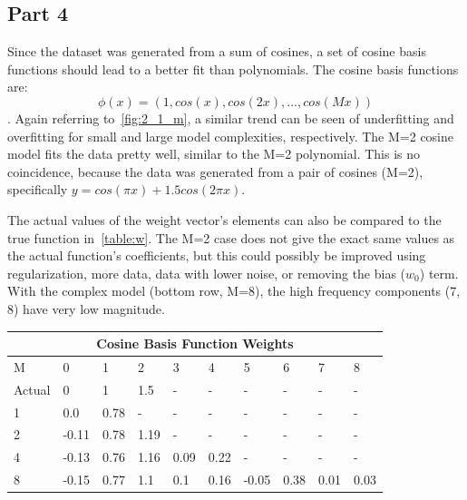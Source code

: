 \subsection{Part 4}
Since the dataset was generated from a sum of cosines, a set of cosine basis functions should lead to a better fit than polynomials.
The cosine basis functions are:
\begin{equation}
	\phi(x)=(1, cos(x), cos(2x), ... , cos(Mx))
\end{equation}.
Again referring to~\cref{fig:2_1_m}, a similar trend can be seen of underfitting and overfitting for small and large model complexities, respectively.
The M=2 cosine model fits the data pretty well, similar to the M=2 polynomial.
This is no coincidence, because the data was generated from a pair of cosines (M=2), specifically $y = cos(\pi x) + 1.5cos(2\pi x)$.

The actual values of the weight vector's elements can also be compared to the true function in~\cref{table:w}.
The M=2 case does not give the exact same values as the actual function's coefficients, but this could possibly be improved using regularization, more data, data with lower noise, or removing the bias ($w_0$) term.
With the complex model (bottom row, M=8), the high frequency components (7, 8) have very low magnitude.

\begin{table}[t]
  \centering
	\begin{tabular}{|p{1cm}||p{1cm}|p{1cm}|p{1cm}|p{1cm}|p{1cm}|p{1cm}|p{1cm}|p{1cm}|p{1cm}|}
	 \hline
	 \multicolumn{10}{|c|}{Cosine Basis Function Weights} \\
	 \hline
	 M & 0 & 1 & 2 & 3 & 4 & 5 & 6 & 7 & 8 \\
	 \hline\hline
	 Actual & 0 & 1 & 1.5 & - & - & - & - & - & - \\
	 1 & 0.0 & 0.78 & - & - & - & - & - & - & - \\
	 2 & -0.11 & 0.78 & 1.19 & - & - & - & - & - & - \\
	 4 & -0.13 & 0.76 & 1.16 & 0.09 & 0.22 & - & - & - & - \\
	 8 & -0.15 & 0.77 & 1.1 & 0.1 & 0.16 & -0.05 & 0.38 & 0.01 & 0.03  \\
	 \hline
	\end{tabular}
\end{table}\label{table:w}

